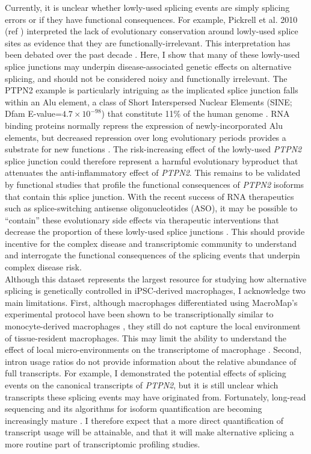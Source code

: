 Currently, it is unclear whether lowly-used splicing events are simply splicing errors \cite{Pickrell2010-lz,Melamud2009-my} or if they have functional consequences\cite{Wright2022-gp,Rotival2019-ic}. For example,  Pickrell et al. 2010 (ref \cite{Pickrell2010-lz}) interpreted the lack of evolutionary conservation around lowly-used splice sites as evidence that they are functionally-irrelevant. This interpretation has been debated over the past decade \cite{Mazin2021-lb}. Here, I show that many of these lowly-used splice junctions may underpin disease-associated genetic effects on alternative splicing, and should not be considered noisy and functionally irrelevant. The PTPN2 example is particularly intriguing as the implicated splice junction falls within an Alu element, a class of Short Interspersed Nuclear Elements (SINE; Dfam E-value=$4.7\times10^{-98}$) that constitute 11\% of the human genome \cite{Deininger2011-cx}. RNA binding proteins normally repress the expression of newly-incorporated Alu elements, but decreased repression over long evolutionary periods provides a substrate for new functions \cite{Attig2016-mj,Singer2004-km}. The risk-increasing effect of the lowly-used \textit{PTPN2} splice junction could therefore represent a harmful evolutionary byproduct that attenuates the anti-inflammatory effect of \textit{PTPN2}. This remains to be validated by functional studies that profile the functional consequences of \textit{PTPN2} isoforms that contain this splice junction. With the recent success of RNA therapeutics such as splice-switching antisense oligonucleotides (ASO), it may be possible to “contain” these evolutionary side effects via therapeutic interventions that decrease the proportion of these lowly-used splice junctions \cite{Mercuri2018-pi,Roberts2020-rx}. This should provide incentive for the complex disease and transcriptomic community to understand and interrogate the functional consequences of the splicing events that underpin complex disease risk. \\

Although this dataset represents the largest resource for studying how alternative splicing is genetically controlled in iPSC-derived macrophages, I acknowledge two main limitations. First, although macrophages differentiated using MacroMap's experimental protocol have been shown to be transcriptionally similar to monocyte-derived macrophages \cite{Alasoo2018-pv}, they still do not capture the local environment of tissue-resident macrophages. This may limit the ability to understand the effect of local micro-environments on the transcriptome of macrophage \cite{Lavin2014-fb}. Second, intron usage ratios do not provide information about the relative abundance of full transcripts. For example, I demonstrated the potential effects of splicing events on the canonical transcripts of \textit{PTPN2}, but it is still unclear which transcripts these splicing events may have originated from. Fortunately, long-read sequencing and its algorithms for isoform quantification are becoming increasingly mature \cite{AlKhafaji2021-af,Amarasinghe2020-ci,Hu2021-bv}. I therefore expect that a more direct quantification of transcript usage will be attainable, and that it will make alternative splicing a more routine part of transcriptomic profiling studies. 

